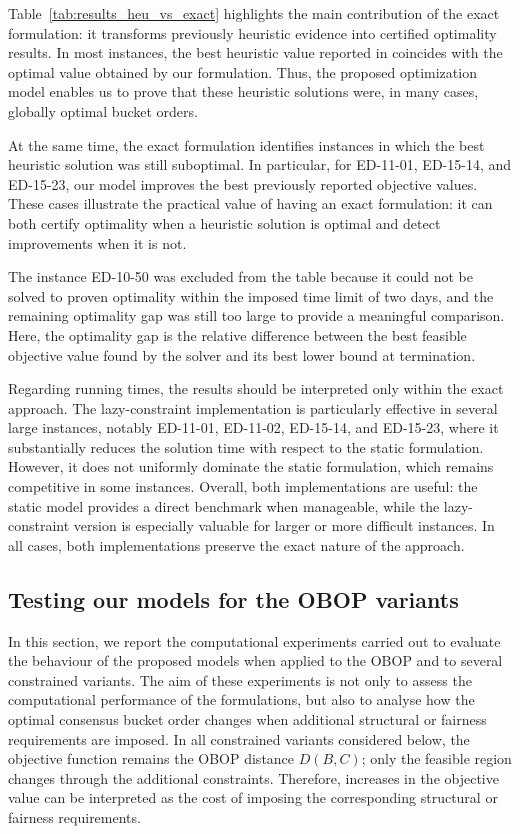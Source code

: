 \documentclass[pdflatex,basic,Numbered]{jnl}%
\theoremstyle{plain}
\theoremstyle{remark}
\theoremstyle{thmstyleone}%
\theoremstyle{thmstylethree}%
\begin{document}
Table~\ref{tab:results_heu_vs_exact} highlights the main contribution of the exact formulation: it transforms previously heuristic evidence into certified optimality results. In most instances, the best heuristic value reported in \cite{aledo2018approaching} coincides with the optimal value obtained by our formulation. Thus, the proposed optimization model enables us to prove that these heuristic solutions were, in many cases, globally optimal bucket orders.

At the same time, the exact formulation identifies instances in which the best heuristic solution was still suboptimal. In particular, for ED-11-01, ED-15-14, and ED-15-23, our model improves the best previously reported objective values. These cases illustrate the practical value of having an exact formulation: it can both certify optimality when a heuristic solution is optimal and detect improvements when it is not.

The instance ED-10-50 was excluded from the table because it could not be solved to proven optimality within the imposed time limit of two days, and the remaining optimality gap was still too large to provide a meaningful comparison. Here, the optimality gap is the relative difference between the best feasible objective value found by the solver and its best lower bound at termination.

Regarding running times, the results should be interpreted only within the exact approach. The lazy-constraint implementation is particularly effective in several large instances, notably ED-11-01, ED-11-02, ED-15-14, and ED-15-23, where it substantially reduces the solution time with respect to the static formulation. However, it does not uniformly dominate the static formulation, which remains competitive in some instances. Overall, both implementations are useful: the static model provides a direct benchmark when manageable, while the lazy-constraint version is especially valuable for larger or more difficult instances. In all cases, both implementations preserve the exact nature of the approach.

\subsection{Testing our models for the {\rm OBOP} variants}
\label{subsec:testing_obop_variants}

In this section, we report the computational experiments carried out to evaluate the behaviour of the proposed models when applied to the {\rm OBOP} and to several constrained variants. The aim of these experiments is not only to assess the computational performance of the formulations, but also to analyse how the optimal consensus bucket order changes when additional structural or fairness requirements are imposed. In all constrained variants considered below, the objective function remains the {\rm OBOP} distance \(D(B,C)\); only the feasible region changes through the additional constraints. Therefore, increases in the objective value can be interpreted as the cost of imposing the corresponding structural or fairness requirements.
\end{document}
